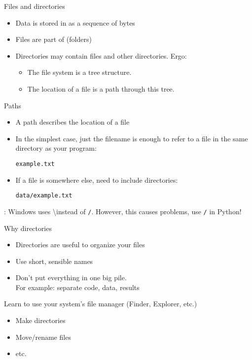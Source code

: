 \documentclass[aspectratio=169,usenames,dvipsnames]{beamer}
\begin{document}
\begin{frame}{Files and directories}
    \begin{itemize}
        \item Data is stored in  as a sequence of bytes
        \item Files are part of  (folders)
        \item Directories may contain files and other directories. Ergo:
            \begin{itemize}
                \item The file system is a tree structure.
                \item The location of a file is a path through this tree.
            \end{itemize}
    \end{itemize}
\end{frame}

\begin{frame}{Paths}
    \begin{itemize}
        \item A path describes the location of a file
        \item In the simplest case, just the filename is enough to
            refer to a file in the same directory as your program:

            \texttt{example.txt}
        \item If a file is somewhere else, need to include directories:

            \texttt{data/example.txt}

    \end{itemize}
    : Windows uses \textbackslash instead of \texttt{/}.
        However, this causes problems, use \texttt{/} in Python!
\end{frame}

\begin{frame}{Why directories}
    \begin{itemize}
        \item Directories are useful to organize your files
        \item Use short, sensible names
        \item Don't put everything in one big pile. \\
            For example: separate code, data, results
    \end{itemize}
    \pause 
    Learn to use your system's file manager (Finder, Explorer, etc.)
    \begin{itemize}
        \item Make directories
        \item Move/rename files
        \item etc.
    \end{itemize}
    
\end{frame}
\end{document}
